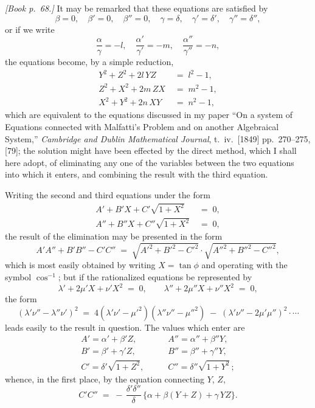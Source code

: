 \documentclass[11pt]{article}
\begin{document}
\bigskip

\noindent\emph{[Book p.~68.]} It may be remarked that these equations are satisfied by
\[
\beta = 0,\quad \beta' = 0,\quad \beta'' = 0,\quad \gamma = \delta,\quad \gamma' = \delta',\quad \gamma'' = \delta'',
\]
or if we write
\[
\frac{\alpha}{\gamma} = -l,\quad \frac{\alpha'}{\gamma'} = -m,\quad \frac{\alpha''}{\gamma''} = -n,
\]
the equations become, by a simple reduction,
\begin{align*}
Y^{2} + Z^{2} + 2l\,YZ &\;=\; l^{2} - 1,\\
Z^{2} + X^{2} + 2m\,ZX &\;=\; m^{2} - 1,\\
X^{2} + Y^{2} + 2n\,XY &\;=\; n^{2} - 1,
\end{align*}
which are equivalent to the equations discussed in my paper ``On a system of Equations connected with Malfatti's Problem and on another Algebraical System,'' \emph{Cambridge and Dublin Mathematical Journal}, t.\ iv.\ [1849] pp.~270--275, [79]; the solution might have been effected by the direct method, which I shall here adopt, of eliminating any one of the variables between the two equations into which it enters, and combining the result with the third equation.

Writing the second and third equations under the form
\begin{align*}
A' + B'X + C'\sqrt{1 + X^{2}} &\;=\; 0,\\
A'' + B''X + C''\sqrt{1 + X^{2}} &\;=\; 0,
\end{align*}
the result of the elimination may be presented in the form
\[
A'A'' + B'B'' - C'C'' \;=\; \sqrt{A'^{2} + B'^{2} - C'^{2}}\cdot\sqrt{A''^{2} + B''^{2} - C''^{2}},
\]
which is most easily obtained by writing $X = \tan\phi$ and operating with the symbol $\cos^{-1}$; but if the rationalized equations be represented by
\[
\lambda' + 2\mu' X + \nu' X^{2} \;=\; 0,\qquad \lambda'' + 2\mu'' X + \nu'' X^{2} \;=\; 0,
\]
the form
\[
(\lambda'\nu'' - \lambda''\nu')^{2} \;=\; 4(\lambda'\nu' - \mu'^{2})(\lambda''\nu'' - \mu''^{2})\;-\;(\lambda'\nu'' - 2\mu'\mu'')^{2}\cdot\cdots
\]
leads easily to the result in question. The values which enter are
\begin{align*}
A' = \alpha' + \beta'Z,&\qquad A'' = \alpha'' + \beta''Y,\\
B' = \beta' + \gamma'Z,&\qquad B'' = \beta'' + \gamma''Y,\\
C' = \delta'\sqrt{1 + Z^{2}},&\qquad C'' = \delta''\sqrt{1 + Y^{2}}\,;
\end{align*}
whence, in the first place, by the equation connecting $Y$, $Z$,
\[
C'C'' \;=\; -\,\frac{\delta'\delta''}{\delta}\,\{\alpha + \beta(Y + Z) + \gamma\,YZ\}.
\]
\end{document}
